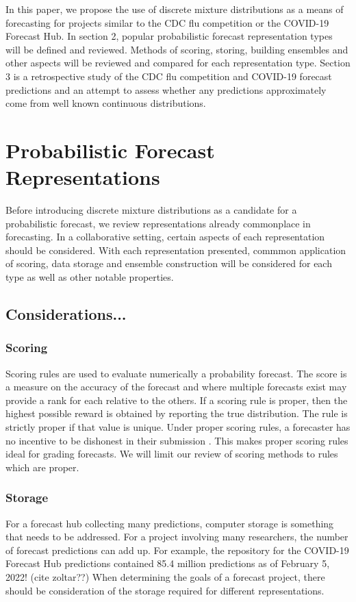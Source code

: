 \documentclass{article}\usepackage[]{graphicx}\usepackage[]{color}
\begin{document}
In this paper, we propose the use of discrete mixture distributions as a means 
of forecasting for projects similar to the CDC flu competition or the COVID-19
Forecast Hub. In section 2, popular probabilistic forecast representation 
types will be defined and reviewed. Methods of scoring, storing, building 
ensembles and other aspects will be reviewed and compared for each 
representation type.
Section 3 is a retrospective study of the CDC flu competition and COVID-19 
forecast predictions and an attempt to assess whether any predictions 
approximately come from well known continuous distributions.


\section{Probabilistic Forecast Representations}

Before introducing discrete mixture distributions as a candidate for a
probabilistic forecast, we review representations already commonplace in 
forecasting. In a collaborative setting, certain aspects of each representation
should be considered. With each representation presented, 
commmon application of 
scoring, data storage and ensemble construction will be considered for each type
as well as other notable properties.

\subsection{Considerations...}
\subsubsection{Scoring}
Scoring rules are used to evaluate numerically a probability forecast. The
score is a measure on the accuracy of the forecast and where multiple forecasts
exist may provide a rank for each relative to the others. If a scoring rule is 
proper, then the highest possible reward is obtained by reporting the true 
distribution. The rule is strictly proper if that value is unique. 
Under proper
scoring rules, a forecaster has no incentive to be dishonest in their 
submission \cite{gneiting2007strictly}. This makes proper scoring rules ideal
for grading forecasts. We will limit our review of scoring methods to rules
which are proper.

\subsubsection{Storage}
For a forecast hub collecting many predictions, computer storage is something
that needs to be addressed. For a project involving many researchers, the 
number of forecast predictions can add up. For example, the repository for the
COVID-19 Forecast Hub predictions contained 85.4 million predictions as of 
February 5, 2022! (cite zoltar??)
When determining the goals of a forecast project, there should be consideration 
of the storage required for different representations.
\end{document}
